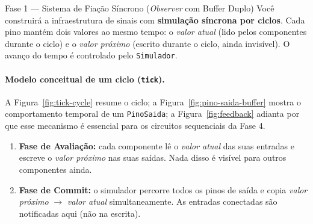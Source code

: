 \documentclass[11pt,a4paper]{article}
\begin{document}
\begin{phasebox}{Fase 1 — Sistema de Fiação Síncrono (\textit{Observer} com Buffer Duplo)}{}
Você construirá a infraestrutura de sinais com \textbf{simulação síncrona por ciclos}. Cada pino mantém dois valores ao mesmo tempo: o \textit{valor atual} (lido pelos componentes durante o ciclo) e o \textit{valor próximo} (escrito durante o ciclo, ainda invisível). O avanço do tempo é controlado pelo \texttt{Simulador}.

\paragraph{Modelo conceitual de um ciclo (\texttt{tick}).}
A Figura~\ref{fig:tick-cycle} resume o ciclo; a Figura~\ref{fig:pino-saida-buffer} mostra o comportamento temporal de um \texttt{PinoSaida}; a Figura~\ref{fig:feedback} adianta por que esse mecanismo é essencial para os circuitos sequenciais da Fase 4.
\begin{enumerate}[label=(\alph*)]
    \item \textbf{Fase de Avaliação:} cada componente lê o \textit{valor atual} das suas entradas e escreve o \textit{valor próximo} nas suas saídas. Nada disso é visível para outros componentes ainda.
    \item \textbf{Fase de Commit:} o simulador percorre todos os pinos de saída e copia \emph{valor próximo} $\rightarrow$ \emph{valor atual} simultaneamente. As entradas conectadas são notificadas aqui (não na escrita).
\end{enumerate}

\begin{figure}[H]
\centering
{}
\end{figure}
\end{phasebox}
\end{document}
